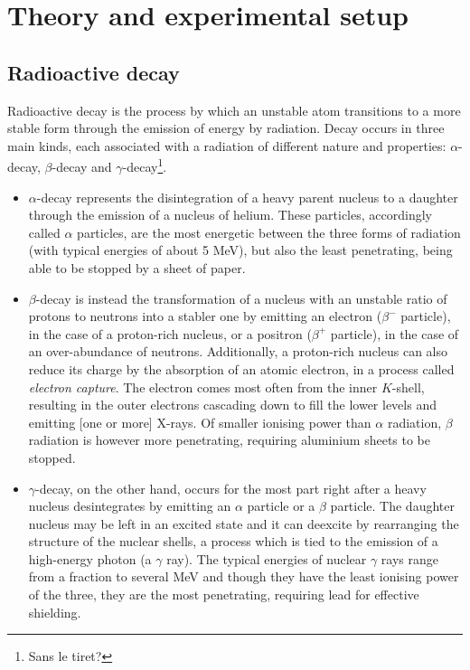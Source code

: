 \section{Theory and experimental setup}
\subsection{Radioactive decay}
\label{sec:radioactivity}

Radioactive decay is the process by which an unstable atom transitions to a more stable form through the emission of energy by radiation.
Decay occurs in three main kinds, each associated with a radiation of different nature and properties: $\alpha$-decay, $\beta$-decay and $\gamma$-decay\footnote{Sans le tiret?}.
\begin{itemize}
    \item $\alpha$-decay represents the disintegration of a heavy parent nucleus to a daughter through the emission of a nucleus of helium.
    These particles, accordingly called $\alpha$ particles, are the most energetic between the three forms of radiation (with typical energies of about 5 MeV), but also the least penetrating, being able to be stopped by a sheet of paper.
    \item $\beta$-decay is instead the transformation of a nucleus with an unstable ratio of protons to neutrons into a stabler one by emitting an electron ($\beta^-$ particle), in the case of a proton-rich nucleus, or a positron ($\beta^+$ particle), in the case of an over-abundance of neutrons.
    Additionally, a proton-rich nucleus can also reduce its charge by the absorption of an atomic electron, in a process called \emph{electron capture}.
    The electron comes most often from the inner $K$-shell, resulting in the outer electrons cascading down to fill the lower levels and emitting [one or more] X-rays\cite{intro_nuclear_particle_physics}.
    Of smaller ionising power than $\alpha$ radiation, $\beta$ radiation is however more penetrating, requiring aluminium sheets to be stopped.
    \item $\gamma$-decay, on the other hand, occurs for the most part right after a heavy nucleus desintegrates by emitting an $\alpha$ particle or a $\beta$ particle.
    The daughter nucleus may be left in an excited state and it can deexcite by rearranging the structure of the nuclear shells, 
    a process which is tied to the emission of a high-energy photon (a $\gamma$ ray).
    The typical energies of nuclear $\gamma$ rays range from a fraction to several MeV 
    and though they have the least ionising power of the three, they are the most penetrating, requiring lead for effective shielding.
\end{itemize}

